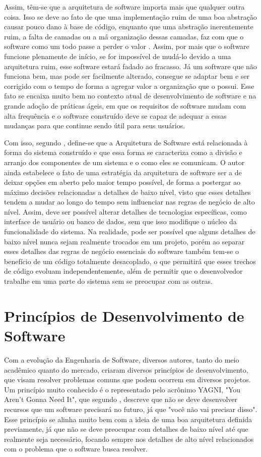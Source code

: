 \documentclass[12pt, %
openright, 
oneside, %
a4paper,    %
brazil]{facom-ufu-abntex2}
\begin{document}
Assim, têm-se que a arquitetura de software importa mais que qualquer outra coisa. Isso se deve ao fato de que uma implementação ruim de uma boa abstração causar pouco dano à base de código, enquanto que uma abstração inerentemente ruim, a falta de camadas ou a má organização dessas camadas, faz com que o software como um todo passe a perder o valor \cite{KIEHL}. Assim, por mais que o software funcione plenamente de início, se for impossível de mudá-lo devido a uma arquitetura ruim, esse software estará fadado ao fracasso. Já um software que não funciona bem, mas pode ser facilmente alterado, consegue se adaptar bem e ser corrigido com o tempo de forma a agregar valor a organização que o possui. Esse fato se encaixa muito bem no contexto atual de desenvolvimento de software e na grande adoção de práticas ágeis, em que os requisitos de software mudam com alta frequência e o software construído deve se capaz de adequar a essas mudanças para que continue sendo útil para seus usuários.

Com isso, segundo , define-se que a Arquitetura de Software está relacionada à forma do sistema construído e que essa forma se caracteriza como a divisão e arranjo dos componentes de um sistema e o como eles se comunicam. O autor ainda estabelece o fato de uma estratégia da arquitetura de software ser a de deixar opções em aberto pelo maior tempo possível, de forma a postergar ao máximo decisões relacionadas a detalhes de baixo nível, visto que esses detalhes tendem a mudar ao longo do tempo sem influenciar nas regras de negócio de alto nível. Assim, deve ser possível alterar detalhes de tecnologias específicas, como interface de usuário ou banco de dados, sem que isso modifique o núcleo da funcionalidade do sistema. Na realidade, pode ser possível que alguns detalhes de baixo nível nunca sejam realmente trocados em um projeto, porém ao separar esses detalhes das regras de negócio essenciais do software também tem-se o benefício de um código totalmente desacoplado, o que permitirá que esses trechos de código evoluam independentemente, além de permitir que o desenvolvedor trabalhe em uma parte do sistema sem se preocupar com as outras.

\section{Princípios de Desenvolvimento de Software}
Com a evolução da Engenharia de Software, diversos autores, tanto do meio acadêmico quanto do mercado, criaram diversos princípios de desenvolvimento, que visam resolver problemas comuns que podem ocorrem em diversos projetos. Um princípio muito conhecido é o representado pelo acrônimo YAGNI, "You Aren't Gonna Need It", que segundo , descreve que não se deve desenvolver recursos que um software precisará no futuro, já que "você não vai precisar disso". Esse princípio se alinha muito bem com a ideia de uma boa arquitetura definida previamente, já que não se deve preocupar com detalhes de baixo nível até que realmente seja necessário, focando sempre nos detalhes de alto nível relacionados com o problema que o software busca resolver.
\end{document}
